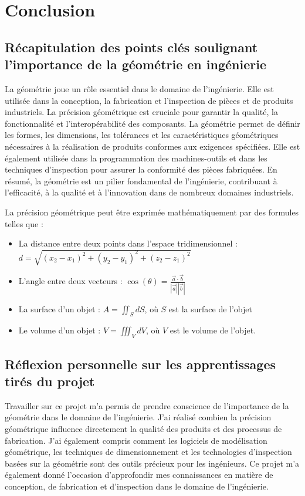\documentclass{article}
\begin{document}
\section{Conclusion}

\subsection{Récapitulation des points clés soulignant l'importance de la géométrie en ingénierie}

La géométrie joue un rôle essentiel dans le domaine de l'ingénierie. Elle est utilisée dans la conception, la fabrication et l'inspection de pièces et de produits industriels. La précision géométrique est cruciale pour garantir la qualité, la fonctionnalité et l'interopérabilité des composants. La géométrie permet de définir les formes, les dimensions, les tolérances et les caractéristiques géométriques nécessaires à la réalisation de produits conformes aux exigences spécifiées. Elle est également utilisée dans la programmation des machines-outils et dans les techniques d'inspection pour assurer la conformité des pièces fabriquées. En résumé, la géométrie est un pilier fondamental de l'ingénierie, contribuant à l'efficacité, à la qualité et à l'innovation dans de nombreux domaines industriels.

La précision géométrique peut être exprimée mathématiquement par des formules telles que :
\begin{itemize}
  \item La distance entre deux points dans l'espace tridimensionnel : $d=\sqrt{(x_2-x_1)^2+(y_2-y_1)^2+(z_2-z_1)^2}$

  \item L'angle entre deux vecteurs : $\cos(\theta) = \frac{\vec{a}\cdot\vec{b}}{|\vec{a}||\vec{b}|}$

  \item La surface d'un objet : $A = \iint_S dS$, où $S$ est la surface de l'objet

  \item Le volume d'un objet : $V = \iiint_V dV$, où $V$ est le volume de l'objet.

\end{itemize}

\subsection{Réflexion personnelle sur les apprentissages tirés du projet}
Travailler sur ce projet m'a permis de prendre conscience de l'importance de la géométrie dans le domaine de l'ingénierie. J'ai réalisé combien la précision géométrique influence directement la qualité des produits et des processus de fabrication. J'ai également compris comment les logiciels de modélisation géométrique, les techniques de dimensionnement et les technologies d'inspection basées sur la géométrie sont des outils précieux pour les ingénieurs. Ce projet m'a également donné l'occasion d'approfondir mes connaissances en matière de conception, de fabrication et d'inspection dans le domaine de l'ingénierie.
\end{document}
